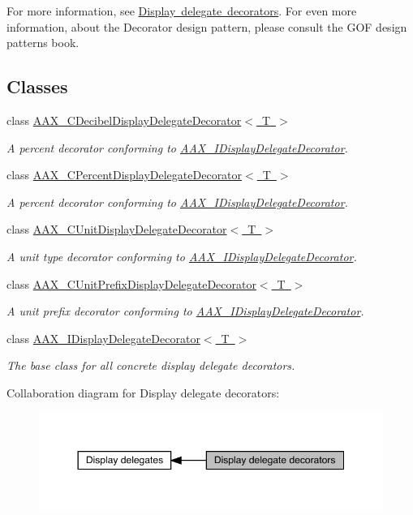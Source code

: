 For more information, see \mbox{\hyperlink{a00816_displaydelegates_decorators}{Display delegate decorators}}. For even more information, about the Decorator design pattern, please consult the G\+OF design patterns book. \subsection*{Classes}
\begin{DoxyCompactItemize}
\item 
class \mbox{\hyperlink{a01469}{A\+A\+X\+\_\+\+C\+Decibel\+Display\+Delegate\+Decorator$<$ T $>$}}
\begin{DoxyCompactList}\small\item\em A percent decorator conforming to \mbox{\hyperlink{a01805}{A\+A\+X\+\_\+\+I\+Display\+Delegate\+Decorator}}. \end{DoxyCompactList}\item 
class \mbox{\hyperlink{a01549}{A\+A\+X\+\_\+\+C\+Percent\+Display\+Delegate\+Decorator$<$ T $>$}}
\begin{DoxyCompactList}\small\item\em A percent decorator conforming to \mbox{\hyperlink{a01805}{A\+A\+X\+\_\+\+I\+Display\+Delegate\+Decorator}}. \end{DoxyCompactList}\item 
class \mbox{\hyperlink{a01585}{A\+A\+X\+\_\+\+C\+Unit\+Display\+Delegate\+Decorator$<$ T $>$}}
\begin{DoxyCompactList}\small\item\em A unit type decorator conforming to \mbox{\hyperlink{a01805}{A\+A\+X\+\_\+\+I\+Display\+Delegate\+Decorator}}. \end{DoxyCompactList}\item 
class \mbox{\hyperlink{a01589}{A\+A\+X\+\_\+\+C\+Unit\+Prefix\+Display\+Delegate\+Decorator$<$ T $>$}}
\begin{DoxyCompactList}\small\item\em A unit prefix decorator conforming to \mbox{\hyperlink{a01805}{A\+A\+X\+\_\+\+I\+Display\+Delegate\+Decorator}}. \end{DoxyCompactList}\item 
class \mbox{\hyperlink{a01805}{A\+A\+X\+\_\+\+I\+Display\+Delegate\+Decorator$<$ T $>$}}
\begin{DoxyCompactList}\small\item\em The base class for all concrete display delegate decorators. \end{DoxyCompactList}\end{DoxyCompactItemize}
Collaboration diagram for Display delegate decorators\+:
\nopagebreak
\begin{figure}[H]
\begin{center}
\leavevmode
\includegraphics[width=350pt]{a00817}
\end{center}
\end{figure}
